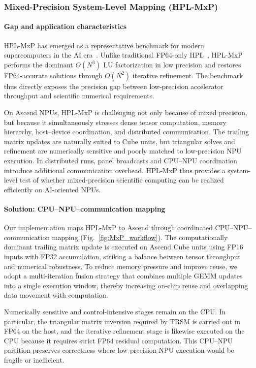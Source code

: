 \documentclass{article}
\newcommand{\rev}[1]{#1}
\begin{document}
\subsubsection{Mixed-Precision System-Level Mapping (HPL-MxP)}

\paragraph{Gap and application characteristics}
HPL-MxP has emerged as a representative benchmark for modern supercomputers in the AI era~\cite{10.1177/10943420251382476, haidar2018harnessing}. Unlike traditional FP64-only HPL~\cite{dongarra2003linpack}, HPL-MxP performs the dominant $O(N^3)$ LU factorization in low precision and restores FP64-accurate solutions through $O(N^2)$ iterative refinement. The benchmark thus directly exposes the precision gap between low-precision accelerator throughput and scientific numerical requirements.

On Ascend NPUs, HPL-MxP is challenging not only because of mixed precision, but because it simultaneously stresses dense tensor computation, memory hierarchy, host--device coordination, and distributed communication. The trailing matrix updates are naturally suited to Cube units, but triangular solves and refinement are numerically sensitive and poorly matched to low-precision NPU execution. In distributed runs, panel broadcasts and CPU--NPU coordination introduce additional communication overhead. HPL-MxP thus provides a system-level test of whether mixed-precision scientific computing can be realized efficiently on AI-oriented NPUs.

\paragraph{Solution: CPU--NPU--communication mapping}
\rev{Our implementation maps HPL-MxP to Ascend through coordinated CPU--NPU--communication mapping (Fig.~\ref{fig:MxP_workflow}).} The computationally dominant trailing matrix update is executed on Ascend Cube units using FP16 inputs with FP32 accumulation, striking a balance between tensor throughput and numerical robustness. To reduce memory pressure and improve reuse, we adopt a multi-iteration fusion strategy that combines multiple GEMM updates into a single execution window, thereby increasing on-chip reuse and overlapping data movement with computation.

Numerically sensitive and control-intensive stages remain on the CPU. In particular, the triangular matrix inversion required by TRSM is carried out in FP64 on the host, and the iterative refinement stage is likewise executed on the CPU because it requires strict FP64 residual computation. This CPU--NPU partition preserves correctness where low-precision NPU execution would be fragile or inefficient.
\end{document}
